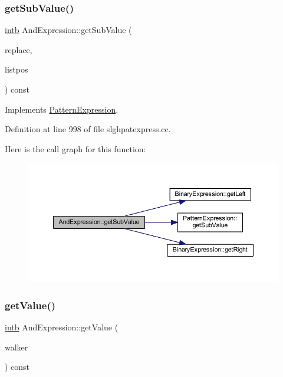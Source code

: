 \subsubsection{\texorpdfstring{getSubValue()}{getSubValue()}}
{\footnotesize\ttfamily \mbox{\hyperlink{types_8h_aa925ba3e627c2df89d5b1cfe84fb8572}{intb}} And\+Expression\+::get\+Sub\+Value (\begin{DoxyParamCaption}\item[{const vector$<$ \mbox{\hyperlink{types_8h_aa925ba3e627c2df89d5b1cfe84fb8572}{intb}} $>$ \&}]{replace,  }\item[{int4 \&}]{listpos }\end{DoxyParamCaption}) const\hspace{0.3cm}{\ttfamily [virtual]}}



Implements \mbox{\hyperlink{class_pattern_expression_ade37db4aa76dd442b189bf4a6bb2d9dd}{Pattern\+Expression}}.



Definition at line 998 of file slghpatexpress.\+cc.

Here is the call graph for this function\+:
\nopagebreak
\begin{figure}[H]
\begin{center}
\leavevmode
\includegraphics[width=350pt]{class_and_expression_ae2df156ce0c2a28f3a677fed7b084d07_cgraph}
\end{center}
\end{figure}
\mbox{\label{class_and_expression_aaf0fb77253a034fac726186fd0f64cad}} 
\subsubsection{\texorpdfstring{getValue()}{getValue()}}
{\footnotesize\ttfamily \mbox{\hyperlink{types_8h_aa925ba3e627c2df89d5b1cfe84fb8572}{intb}} And\+Expression\+::get\+Value (\begin{DoxyParamCaption}\item[{\mbox{\hyperlink{class_parser_walker}{Parser\+Walker}} \&}]{walker }\end{DoxyParamCaption}) const\hspace{0.3cm}{\ttfamily [virtual]}}



